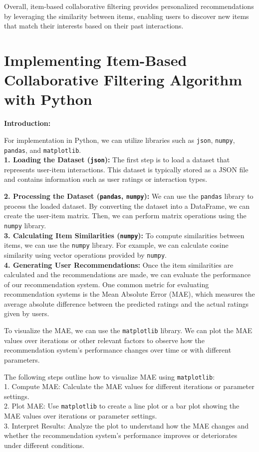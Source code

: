 \documentclass[conference]{IEEEtran}
\begin{document}
Overall, item-based collaborative filtering provides personalized recommendations by leveraging the similarity between items, enabling users to discover new items that match their interests based on their past interactions.


\section{Implementing Item-Based Collaborative Filtering Algorithm with Python}

\textbf{Introduction:}

For implementation in Python, we can utilize libraries such as \texttt{json}, \texttt{numpy}, \texttt{pandas}, and \texttt{matplotlib}.\\

\textbf{1. Loading the Dataset (\texttt{json}):} The first step is to load a dataset that represents user-item interactions. This dataset is typically stored as a JSON file and contains information such as user ratings or interaction types.

\textbf{2. Processing the Dataset (\texttt{pandas}, \texttt{numpy}):} We can use the \texttt{pandas} library to process the loaded dataset. By converting the dataset into a DataFrame, we can create the user-item matrix. Then, we can perform matrix operations using the \texttt{numpy} library.\\

\textbf{3. Calculating Item Similarities (\texttt{numpy}):} To compute similarities between items, we can use the \texttt{numpy} library. For example, we can calculate cosine similarity using vector operations provided by \texttt{numpy}.\\

\textbf{4. Generating User Recommendations:} Once the item similarities are calculated and the recommendations are made, we can evaluate the performance of our recommendation system. One common metric for evaluating recommendation systems is the Mean Absolute Error (MAE), which measures the average absolute difference between the predicted ratings and the actual ratings given by users.

To visualize the MAE, we can use the \texttt{matplotlib} library. We can plot the MAE values over iterations or other relevant factors to observe how the recommendation system's performance changes over time or with different parameters.

The following steps outline how to visualize MAE using \texttt{matplotlib}:\\
1. Compute MAE: Calculate the MAE values for different iterations or parameter settings.\\
2. Plot MAE: Use \texttt{matplotlib} to create a line plot or a bar plot showing the MAE values over iterations or parameter settings.\\
3. Interpret Results: Analyze the plot to understand how the MAE changes and whether the recommendation system's performance improves or deteriorates under different conditions.\\
\end{document}
